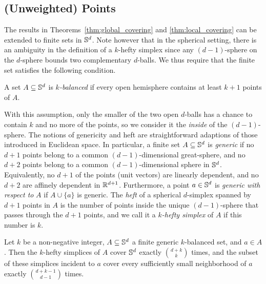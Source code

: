 \documentclass[a4paper,UKenglish,cleveref, autoref,numberwithinsect]{socg-lipics-v2021}
\newcommand {\mm}[1] {\ifmmode{#1}\else{\mbox{\(#1\)}}\fi}
\theoremstyle{plain}
\newcommand{\Rspace}        {\mm{{\mathbb R}}}
\newcommand{\Sspace}        {\mm{{\mathbb S}}}
\begin{document}
\subsection{(Unweighted) Points}
\label{sec:3.1}
The results in Theorems~\ref{thm:global_covering} and \ref{thm:local_covering} can be extended to finite sets in $\Sspace^d$.
Note however that in the spherical setting, there is an ambiguity in the definition of a $k$-hefty simplex since any $(d-1)$-sphere on the $d$-sphere bounds two complementary $d$-balls.
We thus require that the finite set satisfies the following condition.
\begin{definition}
  \label{dfn:balanced_sets}
  A set $A \subseteq \Sspace^d$ is \emph{$k$-balanced} if every open hemisphere contains at least $k+1$ points of $A$.
\end{definition}
With this assumption, only the smaller of the two open $d$-balls has a chance to contain $k$ and no more of the points, so we consider it the \emph{inside} of the $(d-1)$-sphere.
The notions of genericity and heft are straightforward adaptions of those introduced in Euclidean space.
In particular, a finite set $A \subseteq \Sspace^d$ is \emph{generic} if no $d+1$ points belong to a common $(d-1)$-dimensional great-sphere, and no $d+2$ points belong to a common $(d-1)$-dimensional sphere in $\Sspace^d$.
Equivalently, no $d+1$ of the points (unit vectors) are linearly dependent, and no $d+2$ are affinely dependent in $\Rspace^{d+1}$.
Furthermore, a point $a \in \Sspace^d$ is \emph{generic with respect to} $A$ if $A \cup \{a\}$ is generic.
The \emph{heft} of a spherical $d$-simplex spanned by $d+1$ points in $A$ is the number of points inside the unique $(d-1)$-sphere that passes through the $d+1$ points, and we call it a \emph{$k$-hefty simplex} of $A$ if this number is $k$.
\begin{theorem}
  \label{thm:covering_on_sphere}
  Let $k$ be a non-negative integer, $A \subseteq \Sspace^d$ a finite generic $k$-balanced set, and $a \in A$.
  Then the $k$-hefty simplices of $A$ cover $\Sspace^d$ exactly $\binom{d+k}{k}$ times, and the subset of these simplices incident to $a$ cover every sufficiently small neighborhood of $a$ exactly $\binom{d+k-1}{d-1}$ times.
\end{theorem}
\end{document}
